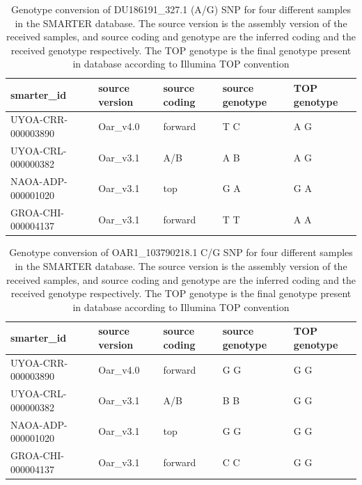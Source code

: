 \documentclass[a4paper,num-refs,gigabyte]{oup-contemporary}
\begin{document}
\begin{table}[bt!]
\caption{Genotype conversion of DU186191\_327.1 (A/G) SNP for four different samples in the SMARTER database. The source version is the assembly version of the received samples, and source coding and genotype are the inferred coding and the received genotype respectively. The TOP genotype is the final genotype present in database according to Illumina TOP\citep{IlluminaTOP} convention}
\label{tab:atogSNP}
\begin{center}
\begin{tabular}{l l l l l}
\toprule
smarter\_id & source version & source coding & source genotype & TOP genotype \\
\midrule
UYOA-CRR-000003890 & Oar\_v4.0 & forward & T C & A G \\
UYOA-CRL-000000382 & Oar\_v3.1 & A/B & A B & A G \\
NAOA-ADP-000001020 & Oar\_v3.1 & top & G A & G A \\
GROA-CHI-000004137 & Oar\_v3.1 & forward & T T & A A \\
\bottomrule
\end{tabular}
\end{center}
\end{table}

\begin{table}[bt!]
\caption{Genotype conversion of OAR1\_103790218.1 C/G SNP for four different samples in the SMARTER database. The source version is the assembly version of the received samples, and source coding and genotype are the inferred coding and the received genotype respectively. The TOP genotype is the final genotype present in database according to Illumina TOP\citep{IlluminaTOP} convention}
\label{tab:ctogSNP}
\begin{center}
\begin{tabular}{l l l l l}
\toprule
smarter\_id & source version & source coding & source genotype & TOP genotype \\
\midrule
UYOA-CRR-000003890 & Oar\_v4.0 & forward & G G & G G \\
UYOA-CRL-000000382 & Oar\_v3.1 & A/B & B B & G G \\
NAOA-ADP-000001020 & Oar\_v3.1 & top & G G & G G \\
GROA-CHI-000004137 & Oar\_v3.1 & forward & C C & G G \\
\bottomrule
\end{tabular}
\end{center}
\end{table}
\end{document}
